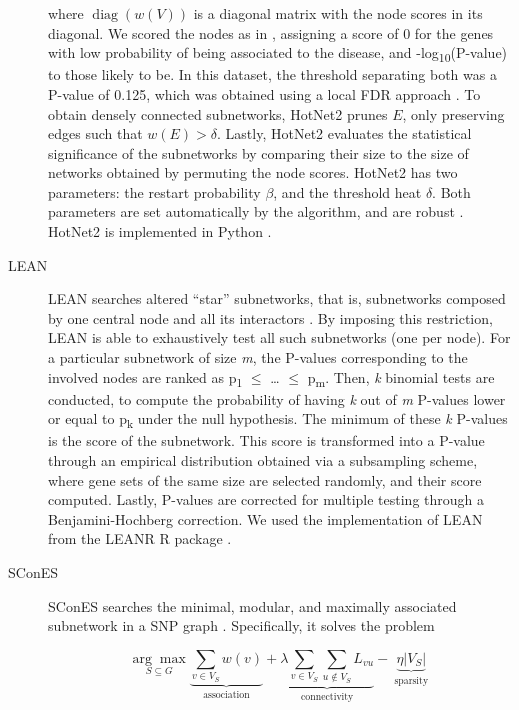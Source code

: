 \documentclass[twocolumn, 11pt]{article}
\begin{document}
\begin{description}
where $\operatorname{diag}(w(V))$ is a diagonal matrix with the node scores in its diagonal. We scored the nodes as in \citet{nakka_gene_2016}, assigning a score of 0 for the genes with low probability of being associated to the disease, and -log\textsubscript{10}(P-value) to those likely to be. In this dataset, the threshold separating both was a P-value of 0.125, which was obtained using a local FDR approach \cite{scheid_twilight;_2005}. To obtain densely connected subnetworks, HotNet2 prunes $E$, only preserving edges such that $w(E) > \delta$. Lastly, HotNet2 evaluates the statistical significance of the subnetworks by comparing their size to the size of networks obtained by permuting the node scores. HotNet2 has two parameters: the restart probability \(\beta\), and the threshold heat \(\delta\). Both parameters are set automatically by the algorithm, and are robust \cite{leiserson_pan-cancer_2015}. HotNet2 is implemented in Python \cite{hotnet2}.

\item[{LEAN}] LEAN searches altered ``star'' subnetworks, that is, subnetworks composed by one central node and all its interactors \cite{gwinner_network-based_2016}. By imposing this restriction, LEAN is able to exhaustively test all such subnetworks (one per node). For a particular subnetwork of size \emph{m}, the P-values corresponding to the involved nodes are ranked as p\textsubscript{1} \(\le\) \dots{} \(\le\) p\textsubscript{m}. Then, \emph{k} binomial tests are conducted, to compute the probability of having \emph{k} out of \emph{m} P-values lower or equal to p\textsubscript{k} under the null hypothesis. The minimum of these \emph{k} P-values is the score of the subnetwork. This score is transformed into a P-value through an empirical distribution obtained via a subsampling scheme, where gene sets of the same size are selected randomly, and their score computed. Lastly, P-values are corrected for multiple testing through a Benjamini-Hochberg correction. We used the implementation of LEAN from the LEANR R package \cite{leanr}.
\item[{SConES}] SConES searches the minimal, modular, and maximally associated subnetwork in a SNP graph \cite{azencott_efficient_2013}. Specifically, it solves the problem

\begin{equation}
\label{eq:scones}
\underset{S \subseteq G}{\arg \max } \underbrace{\sum_{v \in V_S} w(v)}_{\text { association }} + \underbrace{\lambda \sum_{v \in V_S} \sum_{u \not\in V_S} L_{vu} }_{\text { connectivity }}-\underbrace{\eta \lvert V_S \rvert }_{\text { sparsity }}
\end{equation}


\end{description}
\end{document}
